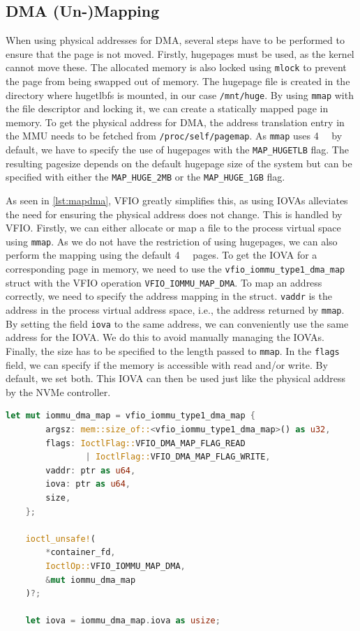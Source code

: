 \subsection{DMA (Un-)Mapping}\label{sec:dmamapping}
When using physical addresses for DMA, several steps have to be performed to ensure that the page is not moved. Firstly, hugepages must be used, as the kernel cannot move these. The allocated memory is also locked using \texttt{mlock} to prevent the page from being swapped out of memory. The hugepage file is created in the directory where hugetlbfs is mounted, in our case \texttt{/mnt/huge}. By using \texttt{mmap} with the file descriptor and locking it, we can create a statically mapped page in memory. To get the physical address for DMA, the address translation entry in the MMU needs to be fetched from \texttt{/proc/self/pagemap}. As \texttt{mmap} uses \qty{4}{\kibi\byte} by default, we have to specify the use of hugepages with the \texttt{MAP\_HUGETLB} flag. The resulting pagesize depends on the default hugepage size of the system but can be specified with either the \texttt{MAP\_HUGE\_2MB} or the \texttt{MAP\_HUGE\_1GB} flag.

As seen in \autoref{lst:mapdma}, VFIO greatly simplifies this, as using IOVAs alleviates the need for ensuring the physical address does not change. This is handled by VFIO. Firstly, we can either allocate or map a file to the process virtual space using \texttt{mmap}. As we do not have the restriction of using hugepages, we can also perform the mapping using the default \qty{4}{\kibi\byte} pages.
To get the IOVA for a corresponding page in memory, we need to use the \texttt{vfio\_iommu\_type1\_dma\_map} struct with the VFIO operation \texttt{VFIO\_IOMMU\_MAP\_DMA}. To map an address correctly, we need to specify the address mapping in the struct. \texttt{vaddr} is the address in the process virtual address space, i.e., the address returned by \texttt{mmap}. By setting the field \texttt{iova} to the same address, we can conveniently use the same address for the IOVA. We do this to avoid manually managing the IOVAs. Finally, the size has to be specified to the length passed to \texttt{mmap}. In the \texttt{flags} field, we can specify if the memory is accessible with read and/or write. By default, we set both. This IOVA can then be used just like the physical address by the NVMe controller.

\begin{minipage}{.95\linewidth}
    \begin{lstlisting}[language=Rust,caption={Mapping memory for DMA}, label=lst:mapdma]
    let mut iommu_dma_map = vfio_iommu_type1_dma_map {
        argsz: mem::size_of::<vfio_iommu_type1_dma_map>() as u32,
        flags: IoctlFlag::VFIO_DMA_MAP_FLAG_READ 
                | IoctlFlag::VFIO_DMA_MAP_FLAG_WRITE,
        vaddr: ptr as u64,
        iova: ptr as u64,
        size,
    };

    ioctl_unsafe!(
        *container_fd,
        IoctlOp::VFIO_IOMMU_MAP_DMA,
        &mut iommu_dma_map
    )?;

    let iova = iommu_dma_map.iova as usize; 
\end{lstlisting}
\end{minipage}

